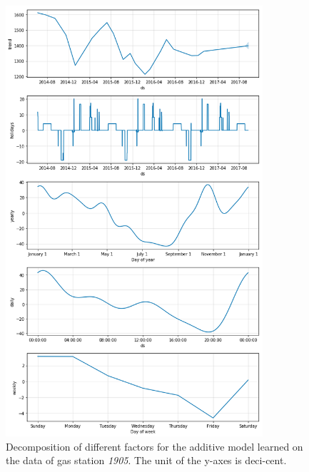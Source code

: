 \begin{figure}
\vspace{-10pt}
  \centering
    \includegraphics[width=0.85\textwidth
    ]{img/prophet-model-1905.png}
    \caption{Decomposition of different factors for the additive model learned on the data of gas station \textit{1905}. The unit of the y-axes is deci-cent.
    }
    \label{prophet-factors}
\end{figure}